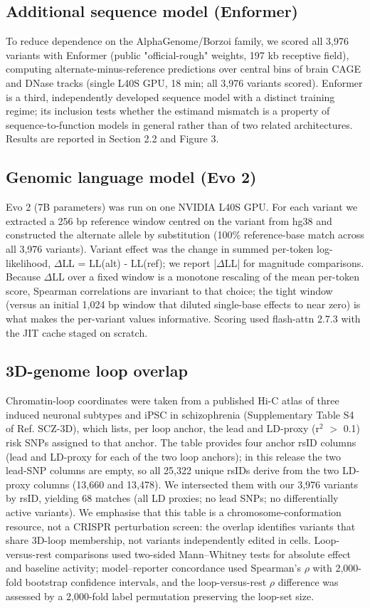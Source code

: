 \documentclass[9pt,twocolumn]{article}
\begin{document}
\subsection{Additional sequence model (Enformer)}

To reduce dependence on the AlphaGenome/Borzoi family, we scored all 3,976 variants with Enformer (public "official-rough" weights, 197 kb receptive field), computing alternate-minus-reference predictions over central bins of brain CAGE and DNase tracks (single L40S GPU, 18 min; all 3,976 variants scored). Enformer is a third, independently developed sequence model with a distinct training regime; its inclusion tests whether the estimand mismatch is a property of sequence-to-function models in general rather than of two related architectures. Results are reported in Section 2.2 and Figure 3.


\subsection{Genomic language model (Evo 2)}

Evo 2 (7B parameters) was run on one NVIDIA L40S GPU. For each variant we extracted a 256 bp reference window centred on the variant from hg38 and constructed the alternate allele by substitution (100\% reference-base match across all 3,976 variants). Variant effect was the change in summed per-token log-likelihood, $\Delta$LL = LL(alt) - LL(ref); we report |$\Delta$LL| for magnitude comparisons. Because $\Delta$LL over a fixed window is a monotone rescaling of the mean per-token score, Spearman correlations are invariant to that choice; the tight window (versus an initial 1,024 bp window that diluted single-base effects to near zero) is what makes the per-variant values informative. Scoring used flash-attn 2.7.3 with the JIT cache staged on scratch.


\subsection{3D-genome loop overlap}

Chromatin-loop coordinates were taken from a published Hi-C atlas of three induced neuronal subtypes and iPSC in schizophrenia (Supplementary Table S4 of Ref. SCZ-3D), which lists, per loop anchor, the lead and LD-proxy (r$^2$ $>$ 0.1) risk SNPs assigned to that anchor. The table provides four anchor rsID columns (lead and LD-proxy for each of the two loop anchors); in this release the two lead-SNP columns are empty, so all 25,322 unique rsIDs derive from the two LD-proxy columns (13,660 and 13,478). We intersected them with our 3,976 variants by rsID, yielding 68 matches (all LD proxies; no lead SNPs; no differentially active variants). We emphasise that this table is a chromosome-conformation resource, not a CRISPR perturbation screen: the overlap identifies variants that share 3D-loop membership, not variants independently edited in cells. Loop-versus-rest comparisons used two-sided Mann--Whitney tests for absolute effect and baseline activity; model--reporter concordance used Spearman's $\rho$ with 2,000-fold bootstrap confidence intervals, and the loop-versus-rest $\rho$ difference was assessed by a 2,000-fold label permutation preserving the loop-set size.
\end{document}

